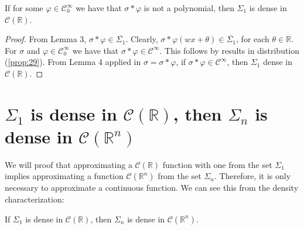 \documentclass[../main.tex]{subfiles}
\begin{document}
	\begin{lema} %
		If for some $\varphi \in \mathcal{C}^\infty_0 $ we have that $\sigma \ast \varphi $ is not a polynomial, then $\Sigma_1$ is dense in $\mathcal{C}(\mathbb{R})$.
	\end{lema}
	 \begin{proof}
	 From Lemma 3, $\sigma \ast \varphi \in  \overline{\Sigma_1}$. Clearly, $\sigma \ast \varphi (wx+\theta ) \in  \overline{\Sigma_1}$, for each $\theta \in \mathbb{R}$. For $\sigma$ and $\varphi \in \mathcal{C}^\infty_0$ we have that $\sigma \ast \varphi \in  \mathcal{C}^\infty $. This follows by results in distribution (\ref{prop:29}).
	 From Lemma 4 applied in $\sigma= \sigma \ast \varphi$, if $\sigma \ast \varphi \in  \mathcal{C}^\infty $, then $\Sigma_1$ dense in $\mathcal{C} (\mathbb{R})$. 
	 \end{proof}
 \section{{$\Sigma_1$ is dense in $\mathcal{C}(\mathbb{R})$, then $\Sigma_n$ is dense in $\mathcal{C}(\mathbb{R}^n)$ }}
 
 \noindent We will proof that approximating a $\mathcal{C}(\mathbb{R})$ function  with one from the set $\Sigma_1$ implies approximating a function $\mathcal{C}(\mathbb{R}^n)$ from the set $\Sigma_n$. Therefore, it is only necessary to approximate a continuous function. We can see this from the density characterization:

	\begin{lema}  %
			If $\Sigma_1$ is dense in $\mathcal{C}(\mathbb{R})$, then $\Sigma_n$ is dense in $\mathcal{C}(\mathbb{R}^n)$. 
		\end{lema}
	
\end{document}
